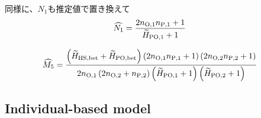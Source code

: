 \documentclass[AMA,STIX1COL]{WileyNJD-v2}
\begin{document}
同様に、$N_1$も推定値で置き換えて
\begin{align}
\widehat{N_1} &= \frac{ 2 n_{\rm O, 1} n_{\rm P, 1} + 1 }{\widetilde{H}_{\rm PO, 1} + 1} 
\label{AP-6}
\end{align}

\begin{align}
\widehat{M_5} &=  \frac{ \left(\widetilde{H}_{\rm HS,bet} + \widetilde{H}_{\rm PO,bet}\right) \left(2 n_{\rm O, 1} n_{\rm P, 1} + 1\right) \left(2 n_{\rm O, 2} n_{\rm P, 2} + 1\right)} {2n_{\rm O, 1} \left(2 n_{\rm O, 2} + n_{\rm P, 2}\right) \left(\widetilde{H}_{\rm PO, 1} + 1\right) \left(\widetilde{H}_{\rm PO, 2} + 1\right)}
\label{AP-7}
\end{align}

\subsection{Individual-based model}
\end{document}
